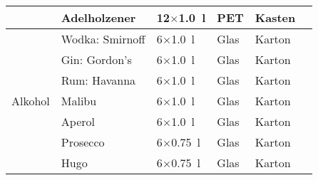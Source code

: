 {{\begin{center}
\begin{tabular}{|p{2cm}|p{3.5cm}lll|l|}
  & Adelholzener & 12$\times$\SI{1.0}{\litre}  & PET  & Kasten &  \\
  \hline
  \multirow{7}{*}{Alkohol}
  & Wodka: Smirnoff & 6$\times$\SI{1.0}{\litre}  & Glas & Karton &  \\
  & Gin: Gordon's   & 6$\times$\SI{1.0}{\litre}  & Glas & Karton &  \\
  & Rum: Havanna    & 6$\times$\SI{1.0}{\litre}  & Glas & Karton &  \\
  & Malibu          & 6$\times$\SI{1.0}{\litre}  & Glas & Karton &  \\
  & Aperol          & 6$\times$\SI{1.0}{\litre}  & Glas & Karton &  \\
  & Prosecco        & 6$\times$\SI{0.75}{\litre} & Glas & Karton &  \\
  & Hugo            & 6$\times$\SI{0.75}{\litre} & Glas & Karton &  \\
  \hline
\end{tabular}
\end{center}
}
}
